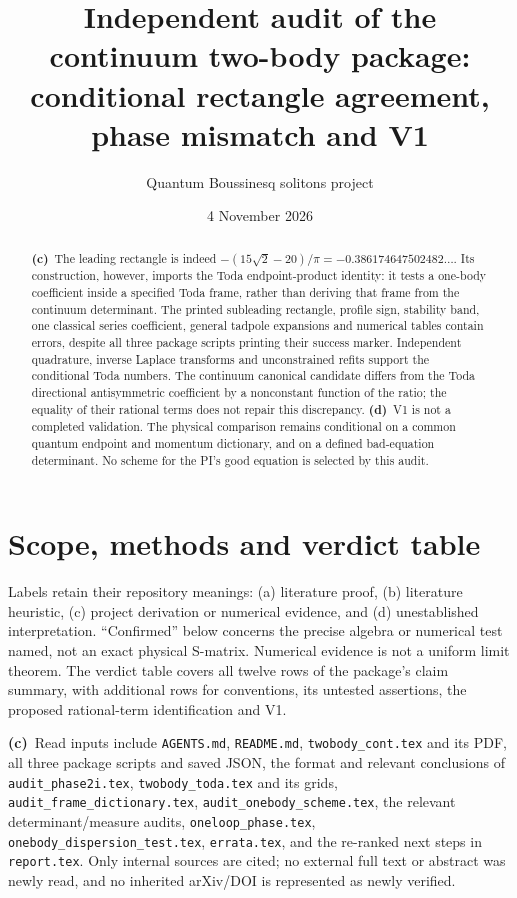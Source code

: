 \documentclass[11pt,a4paper]{article}
\title{Independent audit of the continuum two-body package:\\
conditional rectangle agreement, phase mismatch and V1}
\author{Quantum Boussinesq solitons project}
\date{4 November 2026}
\newcommand{\Lc}{\textbf{(c)}\ }
\newcommand{\Ld}{\textbf{(d)}\ }
\newcommand{\file}[1]{\nolinkurl{#1}}
\begin{document}
\maketitle
\begin{abstract}
\Lc The leading rectangle is indeed
$-(15\sqrt2-20)/\pi=-0.386174647502482\ldots$.
Its construction, however, imports the Toda endpoint-product identity:
it tests a one-body coefficient inside a specified Toda frame, rather than
deriving that frame from the continuum determinant. The printed subleading
rectangle, profile sign, stability band, one classical series coefficient,
general tadpole expansions and numerical tables contain errors, despite all
three package scripts printing their success marker. Independent quadrature,
inverse Laplace transforms and unconstrained refits support the conditional
Toda numbers. The continuum canonical candidate differs from the Toda
directional antisymmetric coefficient by a nonconstant function of the ratio;
the equality of their rational terms does not repair this discrepancy.
\Ld V1 is not a completed validation. The physical comparison remains
conditional on a common quantum endpoint and momentum dictionary, and on
a defined bad-equation determinant. No scheme for the PI's good equation
is selected by this audit.
\end{abstract}

\section{Scope, methods and verdict table}
Labels retain their repository meanings: (a) literature proof, (b) literature
heuristic, (c) project derivation or numerical evidence, and (d) unestablished
interpretation. ``Confirmed'' below concerns the precise algebra or numerical
test named, not an exact physical S-matrix. Numerical evidence is not a uniform
limit theorem. The verdict table covers all twelve rows of the package's
claim summary, with additional rows for conventions, its untested assertions,
the proposed rational-term identification and V1.

\Lc Read inputs include \file{AGENTS.md}, \file{README.md},
\file{twobody_cont.tex} and its PDF, all three package scripts and saved JSON,
the format and relevant conclusions of \file{audit_phase2i.tex},
\file{twobody_toda.tex} and its grids, \file{audit_frame_dictionary.tex},
\file{audit_onebody_scheme.tex}, the relevant determinant/measure audits,
\file{oneloop_phase.tex}, \file{onebody_dispersion_test.tex},
\file{errata.tex}, and the re-ranked next steps in \file{report.tex}.
Only internal sources are cited; no external full text or abstract was newly
read, and no inherited arXiv/DOI is represented as newly verified.
\end{document}
